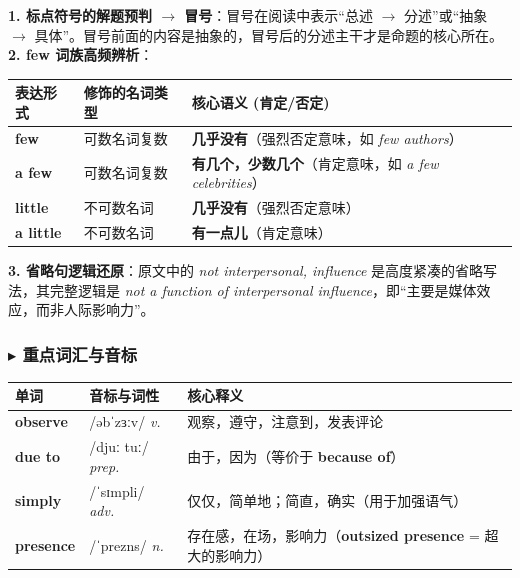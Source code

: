 \documentclass[cn,normal,11pt]{elegantnote}
\newcommand{\retrokey}[1]{{\color{accentcolor}\textbf{#1}}}
\renewcommand{\citshape}{\kaishu\fontspec{Arial}}
\begin{document}
\begin{proposition}
  \textbf{1. 标点符号的解题预判 $\rightarrow$ 冒号}：冒号在阅读中表示“总述 $\rightarrow$ 分述”或“抽象 $\rightarrow$ 具体”。冒号前面的内容是抽象的，冒号后的分述主干才是命题的核心所在。\\
  \textbf{2. few 词族高频辨析}：
  \begin{table}[H]
    \centering
    \small
    \begin{tabularx}{\textwidth}{p{3cm} X X}
      \toprule
      \textbf{表达形式} & \textbf{修饰的名词类型} & \textbf{核心语义 (肯定/否定)} \\
      \midrule
      \textbf{few} & 可数名词复数 & \textbf{几乎没有}（强烈否定意味，如 \textit{few authors}） \\
      \textbf{a few} & 可数名词复数 & \textbf{有几个，少数几个}（肯定意味，如 \textit{a few celebrities}） \\
      \textbf{little} & 不可数名词 & \textbf{几乎没有}（强烈否定意味） \\
      \textbf{a little} & 不可数名词 & \textbf{有一点儿}（肯定意味） \\
      \bottomrule
    \end{tabularx}
  \end{table}
  \textbf{3. 省略句逻辑还原}：原文中的 \textit{not interpersonal, influence} 是高度紧凑的省略写法，其完整逻辑是 \textit{not a function of interpersonal influence}，即“主要是媒体效应，而非人际影响力”。
\end{proposition}

\subsubsection*{$\blacktriangleright$ 重点词汇与音标}
\noindent
\begin{tabularx}{\textwidth}{l X p{7cm}}
  \toprule
  \textbf{单词} & \textbf{音标与词性} & \textbf{核心释义} \\
  \midrule
  \retrokey{observe} & {\citshape /əbˈzɜːv/} \textit{v.} & 观察，遵守，注意到，发表评论 \\
  \midrule
  \retrokey{due to} & {\citshape /djuː tuː/} \textit{prep.} & 由于，因为（等价于 \textbf{because of}） \\
  \midrule
  \retrokey{simply} & {\citshape /ˈsɪmpli/} \textit{adv.} & 仅仅，简单地；简直，确实（用于加强语气） \\
  \midrule
  \retrokey{presence} & {\citshape /ˈprezns/} \textit{n.} & 存在感，在场，影响力（\textbf{outsized presence} = 超大的影响力） \\
  \bottomrule
\end{tabularx}
\end{document}
